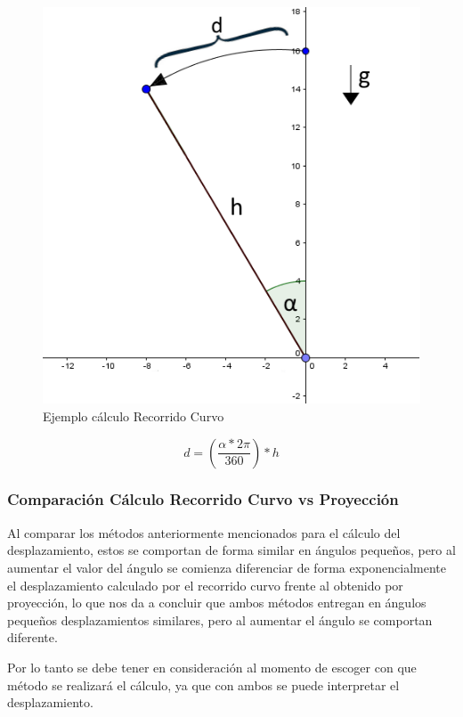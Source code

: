 \documentclass[12pt,a4paper]{article}
\begin{document}
\begin{figure}[H]
	\centering
	\includegraphics[scale=0.5]{images/calculoRecorridoCurvo}
	\caption{Ejemplo cálculo Recorrido Curvo}
	\label{fig:recorridocurvo}
\end{figure}

\begin{equation}
	\label{eq:recorridocurvo}
	d=\left(\frac{\alpha*2\pi}{360}\right)*h
\end{equation}

\subsubsection{Comparación Cálculo Recorrido Curvo vs Proyección}
Al comparar los métodos anteriormente mencionados para el cálculo del desplazamiento, estos se comportan de forma similar en ángulos pequeños, pero al aumentar el valor del ángulo se comienza diferenciar de forma exponencialmente el desplazamiento calculado por el recorrido curvo frente al obtenido por proyección, lo que nos da a concluir que ambos métodos entregan en ángulos pequeños desplazamientos similares, pero al aumentar el ángulo se comportan diferente.

Por lo tanto se debe tener en consideración al momento de escoger con que método se realizará el cálculo, ya que con ambos se puede interpretar el desplazamiento.
\end{document}
